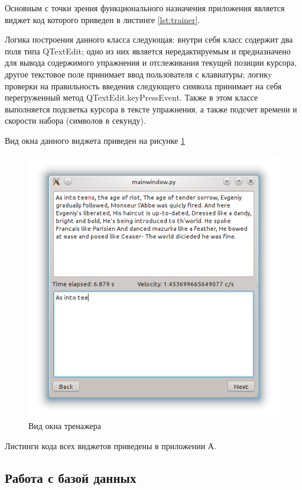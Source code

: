 Основным с точки зрения функционального назначения приложения является виджет код которого приведен в листинге \ref{lst:trainer}.



Логика построения данного класса следующая: внутри себя класс содержит два поля типа QTextEdit; одно из них является нередактируемым
и предназначено для вывода содержимого упражнения и отслеживания текущей позиции курсора, другое текстовое
поле принимает ввод пользователя с клавиатуры; логикy проверки на правильность введения следующего символа принимает на
себя перегруженный метод QTextEdit.keyPressEvent. Также в этом классе выполняется подсветка курсора в тексте упражнения,
а также подсчет времени и скорости набора (символов в секунду).

Вид окна данного виджета приведен на рисунке \ref{fig:trainer}

\begin{figure}[h!]
    \centering
    \includegraphics[scale=0.5]{images/trainer.png}
    \caption{Вид окна тренажера}
    \label{fig:trainer}
\end{figure}

Листинги кода всех виджетов приведены в приложении А.

\subsection{Работа с базой данных}
\label{sec:db}

